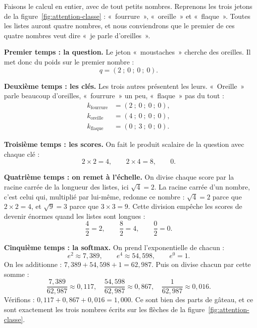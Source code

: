 \begin{exemple}
Faisons le calcul en entier, avec de tout petits nombres. Reprenons les
trois jetons de la figure~\ref{fig:attention-classe} : «~fourrure~»,
«~oreille~» et «~flaque~». Toutes les listes auront quatre nombres, et nous
conviendrons que le premier de ces quatre nombres veut dire «~je parle
d'oreilles~».

\textbf{Premier temps : la question.} Le jeton «~moustaches~» cherche des
oreilles. Il met donc du poids sur le premier nombre :
\[ q = (2 \ ; \ 0 \ ; \ 0 \ ; \ 0). \]

\textbf{Deuxième temps : les clés.} Les trois autres présentent les leurs.
«~Oreille~» parle beaucoup d'oreilles, «~fourrure~» un peu, «~flaque~» pas
du tout :
\[
  \begin{aligned}
    k_{\text{fourrure}} &= (2 \ ; \ 0 \ ; \ 0 \ ; \ 0), \\
    k_{\text{oreille}}  &= (4 \ ; \ 0 \ ; \ 0 \ ; \ 0), \\
    k_{\text{flaque}}   &= (0 \ ; \ 3 \ ; \ 0 \ ; \ 0).
  \end{aligned}
\]

\textbf{Troisième temps : les scores.} On fait le produit scalaire de la
question avec chaque clé :
\[
  2 \times 2 = 4, \qquad
  2 \times 4 = 8, \qquad
  0 .
\]

\textbf{Quatrième temps : on remet à l'échelle.} On divise chaque score par
la racine carrée de la longueur des listes, ici $\sqrt{4} = 2$. La racine
carrée
d'un nombre, c'est celui qui, multiplié par lui-même, redonne ce nombre :
$\sqrt{4} = 2$ parce que $2 \times 2 = 4$, et $\sqrt{9} = 3$ parce que
$3 \times 3 = 9$. Cette division empêche les scores de devenir énormes quand
les listes sont longues :
\[
  \frac{4}{2} = 2, \qquad \frac{8}{2} = 4, \qquad \frac{0}{2} = 0 .
\]

\textbf{Cinquième temps : la softmax.} On prend l'exponentielle de chacun :
\[
  e^{2} \approx 7{,}389, \qquad e^{4} \approx 54{,}598, \qquad e^{0} = 1 .
\]
On les additionne : $7{,}389 + 54{,}598 + 1 = 62{,}987$. Puis on divise
chacun par cette somme :
\[
  \frac{7{,}389}{62{,}987} \approx 0{,}117, \quad
  \frac{54{,}598}{62{,}987} \approx 0{,}867, \quad
  \frac{1}{62{,}987} \approx 0{,}016 .
\]
Vérifions : $0{,}117 + 0{,}867 + 0{,}016 = 1{,}000$. Ce sont bien des parts
de gâteau, et ce sont exactement les trois nombres écrits sur les flèches de
la figure~\ref{fig:attention-classe}.


\end{exemple}
